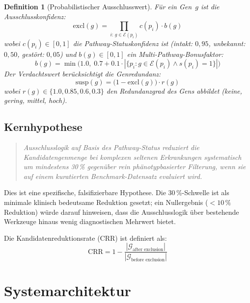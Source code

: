 \documentclass[12pt,a4paper]{article}
\newtheorem{definition}{Definition}
\begin{document}
\begin{definition}[Probabilistischer Ausschlusswert]
\label{def:probabilistic}
Für ein Gen~$g$ ist die Ausschlusskonfi\-denz:
\begin{equation}
    \text{excl}(g) = \prod_{i:\, g \in \mathcal{E}(p_i)} c(p_i) \cdot b(g)
\end{equation}
wobei $c(p_i) \in [0,1]$ die Pathway-Statuskonfidenz ist (intakt: $0{,}95$, unbekannt: $0{,}50$, gestört: $0{,}05$) und $b(g) \in [0,1]$ ein Multi-Pathway-Bonusfaktor:
\begin{equation}
    b(g) = \min\!\Big(1.0,\; 0.7 + 0.1 \cdot |\{p_i : g \in \mathcal{E}(p_i) \wedge s(p_i) = 1\}|\Big)
\end{equation}
Der \emph{Verdachtswert} berücksichtigt die Genredundanz:
\begin{equation}
    \text{susp}(g) = \big(1 - \text{excl}(g)\big) \cdot r(g)
\end{equation}
wobei $r(g) \in \{1.0, 0.85, 0.6, 0.3\}$ den Redundanzgrad des Gens abbildet (keine, gering, mittel, hoch).
\end{definition}

\subsection{Kernhypothese}

\begin{quote}
\emph{Ausschlusslogik auf Basis des Pathway-Status reduziert die Kandidatengenmenge bei komplexen seltenen Erkrankungen systematisch um mindestens 30\,\% gegenüber rein phänotypbasierter Filterung, wenn sie auf einem kuratierten Benchmark-Datensatz evaluiert wird.}
\end{quote}

Dies ist eine spezifische, falsifizierbare Hypothese. Die 30\,\%-Schwelle ist als minimale klinisch bedeutsame Reduktion gesetzt; ein Nullergebnis ($<10\,\%$ Reduktion) würde darauf hinweisen, dass die Ausschlusslogik über bestehende Werkzeuge hinaus wenig diagnostischen Mehrwert bietet.

Die Kandidatenreduktionsrate (CRR) ist definiert als:
\begin{equation}
\label{eq:crr}
    \text{CRR} = 1 - \frac{|\mathcal{G}_{\text{after exclusion}}|}{|\mathcal{G}_{\text{before exclusion}}|}
\end{equation}

\section{Systemarchitektur}
\label{sec:architecture}
\end{document}
